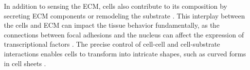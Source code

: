 In addition to sensing the ECM, cells also contribute to its composition by secreting ECM components or remodeling the substrate \cite{malandrino2018}. This interplay between the cells and ECM can impact the tissue behavior fundamentally, as the connections between focal adhesions and the nucleus can affect the expression of transcriptional factors \cite{venturini2020, lomakin2020}. The precise control of cell-cell and cell-substrate interactions enables cells to transform into intricate shapes, such as curved forms in cell sheets \cite{schamberger2022}.

%
%
%
